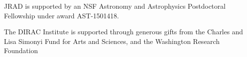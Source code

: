\documentclass[modern]{rnaastex}
\begin{document}
\acknowledgments

JRAD is supported by an NSF Astronomy and Astrophysics Postdoctoral Fellowship under award AST-1501418. 

The DIRAC Institute is supported through generous gifts from the Charles and Lisa Simonyi Fund for Arts and Sciences, and the Washington Research Foundation


\end{document}

